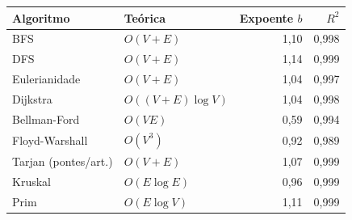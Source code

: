 \begin{tabular}{llrr}
    \toprule
    Algoritmo & Teórica & Expoente $b$ & $R^2$ \\
    \midrule
    BFS & $O(V+E)$ & 1,10 & 0,998 \\
    DFS & $O(V+E)$ & 1,14 & 0,999 \\
    Eulerianidade & $O(V+E)$ & 1,04 & 0,997 \\
    Dijkstra & $O((V+E)\log V)$ & 1,04 & 0,998 \\
    Bellman-Ford & $O(VE)$ & 0,59 & 0,994 \\
    Floyd-Warshall & $O(V^3)$ & 0,92 & 0,989 \\
    Tarjan (pontes/art.) & $O(V+E)$ & 1,07 & 0,999 \\
    Kruskal & $O(E\log E)$ & 0,96 & 0,999 \\
    Prim & $O(E\log V)$ & 1,11 & 0,999 \\
    \bottomrule
\end{tabular}
